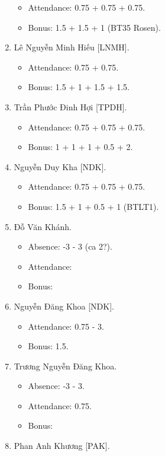 \documentclass{article}
\begin{document}
\begin{enumerate}
    \begin{itemize}
        \item Attendance: 0.75 + 0.75 + 0.75.
        \item Bonus: 1.5 + 1.5 + 1 (BT35 Rosen).
    \end{itemize}
    \item {\sc Lê Nguyễn Minh Hiếu [LNMH].}
    \begin{itemize}
        \item Attendance: 0.75 + 0.75.
        \item Bonus: 1.5 + 1 + 1.5 + 1.5.
    \end{itemize}
    \item {\sc Trần Phước Đinh Hợi [TPDH].}
    \begin{itemize}
        \item Attendance: 0.75 + 0.75 + 0.75.
        \item Bonus: 1 + 1 + 1 + 0.5 + 2.
    \end{itemize}
    \item {\sc Nguyễn Duy Kha [NDK].}
    \begin{itemize}
        \item Attendance: 0.75 + 0.75 + 0.75.
        \item Bonus: 1.5 + 1 + 0.5 + 1 (BTLT1).
    \end{itemize}
    \item {\sc Đỗ Văn Khánh.}
    \begin{itemize}
        \item Absence: -3 - 3 (ca 2?).
        \item Attendance:
        \item Bonus:
    \end{itemize}
    \item {\sc Nguyễn Đăng Khoa [NDK].}
    \begin{itemize}
        \item Attendance: 0.75 - 3.
        \item Bonus: 1.5.
    \end{itemize}
    \item {\sc Trương Nguyễn Đăng Khoa.}
    \begin{itemize}
        \item Absence: -3 - 3.
        \item Attendance: 0.75.
        \item Bonus:
    \end{itemize}
    \item {\sc Phan Anh Khương [PAK].}

\end{enumerate}
\end{document}
